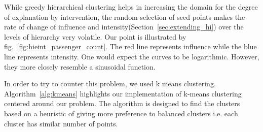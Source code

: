 






While greedy hierarchical clustering helps in increasing the domain for the degree of explanation by intervention, the random selection of seed points makes the rate of change of influence and intensity(Section~\ref{sec:extending_hi}) over the levels of hierarchy very volatile. Our point is illustrated by fig.~\ref{fig:hieint_passenger_count}. The red line represents influence while the blue line represents intensity. One would expect the curves to be logarithmic. However, they more closely resemble a sinusoidal function.
\newpage

In order to try to counter this problem, we used k means clustering. Algorithm~\ref{alg:kmeans} highlights our implementation of k-means clustering centered around our problem. The algorithm is designed to find the clusters based on a heuristic of giving more preference to balanced clusters i.e. each cluster has similar number of points.

